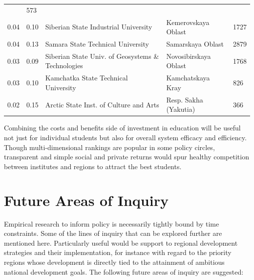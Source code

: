\documentclass[alpha-refs]{wiley-article-04t}
\begin{document}
\begin{table}[htbp!]
\begin{tabular}{|p{.75cm}|p{.75cm}|p{7cm}|p{3cm}|R{1.25cm}|}
		& 573 \\ 
		0.04 & 0.10 & Siberian State Industrial University & Kemerovskaya 
		Oblast & 1727 \\ 
		0.04 & 0.13 & Samara State Technical University & Samarskaya Oblast 
		& 2879 \\ 
		0.03 & 0.09 & Siberian State Univ. of Geosystems \& Technologies & 
		Novosibirskaya Oblast & 1768 \\ 
		0.03 & 0.10 & Kamchatka State Technical University & Kamchatskaya 
		Kray & 826 \\ 
		0.02 & 0.15 & Arctic State Inst. of Culture and Arts & Resp. Sakha 
		(Yakutia) & 366 \\ 
		\hline
	\end{tabular}
\end{table}

Combining the costs and benefits side of investment in education will be 
useful not just for  individual students but also for overall system 
efficacy and efficiency.  Though multi-dimensional rankings are popular in 
some policy circles, transparent and simple social and private returns 
would spur healthy competition between institutes and regions to attract 
the best students. 



\section{Future Areas of Inquiry}

Empirical research to inform policy is necessarily tightly bound by time 
constraints. Some of the lines of inquiry that can be explored further are 
mentioned here. Particularly useful would be support to regional 
development strategies and their implementation, for instance with regard 
to the priority regions whose development is directly tied to the 
attainment of ambitious national development goals. The following future 
areas of inquiry are suggested:
\end{document}
